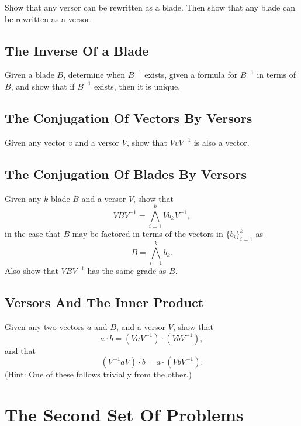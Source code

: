 \documentclass{article}
\begin{document}
Show that any versor can be rewritten as a blade.  Then show that any blade can be rewritten as a versor.

\subsection{The Inverse Of a Blade}

Given a blade $B$, determine when $B^{-1}$ exists, given a formula for $B^{-1}$ in terms of $B$,
and show that if $B^{-1}$ exists, then it is unique.

\subsection{The Conjugation Of Vectors By Versors}\label{prob_vector_versor_conjugation}

Given any vector $v$ and a versor $V$, show that $VvV^{-1}$ is also a vector.

\subsection{The Conjugation Of Blades By Versors}\label{prob_blade_versor_conjugation}

Given any $k$-blade $B$ and a versor $V$, show that
\begin{equation}
VBV^{-1} = \bigwedge_{i=1}^k Vb_kV^{-1},
\end{equation}
in the case that $B$ may be factored in terms of the vectors in $\{b_i\}_{i=1}^k$ as
\begin{equation}
B = \bigwedge_{i=1}^k b_k.
\end{equation}
Also show that $VBV^{-1}$ has the same grade as $B$.

\subsection{Versors And The Inner Product}\label{prob_versors_and_inner_prod}

Given any two vectors $a$ and $B$, and a versor $V$, show that
\begin{equation}
a\cdot b = (VaV^{-1})\cdot(VbV^{-1}),
\end{equation}
and that
\begin{equation}
(V^{-1}aV)\cdot b = a\cdot(VbV^{-1}).
\end{equation}
(Hint: One of these follows trivially from the other.)

\section{The Second Set Of Problems}
\end{document}
